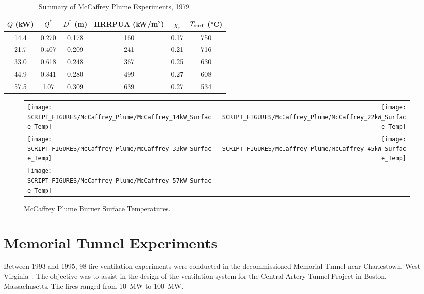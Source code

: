 \begin{table}[!ht]
\caption[Summary of McCaffrey Plume Experiments]{Summary of McCaffrey Plume Experiments, 1979.}
\begin{center}
\begin{tabular}{|c|c|c|c|c|c|}
\hline
$Q$ (kW) & $Q^*$    & $D^*$ (m)   & HRRPUA (kW/m$^2$)  & $\chi_r$ & $T_{\rm surf}$ (\si{\degreeCelsius}) \\ \hline\hline
14.4     & 0.270    & 0.178       & 160                & 0.17     & 750 \\ \hline
21.7     & 0.407    & 0.209       & 241                & 0.21     & 716 \\ \hline
33.0     & 0.618    & 0.248       & 367                & 0.25     & 630 \\ \hline
44.9     & 0.841    & 0.280       & 499                & 0.27     & 608 \\ \hline
57.5     & 1.07     & 0.309       & 639                & 0.27     & 534 \\ \hline
\end{tabular}
\end{center}
\label{tab:McCaffrey_Plume_Exp}
\end{table}

\begin{figure}[p]
\begin{tabular*}{\textwidth}{l@{\extracolsep{\fill}}r}
\texttt{[image: SCRIPT\_FIGURES/McCaffrey\_Plume/McCaffrey\_14kW\_Surface\_Temp]} &
\texttt{[image: SCRIPT\_FIGURES/McCaffrey\_Plume/McCaffrey\_22kW\_Surface\_Temp]} \\
\texttt{[image: SCRIPT\_FIGURES/McCaffrey\_Plume/McCaffrey\_33kW\_Surface\_Temp]} &
\texttt{[image: SCRIPT\_FIGURES/McCaffrey\_Plume/McCaffrey\_45kW\_Surface\_Temp]} \\
\texttt{[image: SCRIPT\_FIGURES/McCaffrey\_Plume/McCaffrey\_57kW\_Surface\_Temp]} &
\end{tabular*}
\caption[McCaffrey Plume Burner Surface Temperatures]
{McCaffrey Plume Burner Surface Temperatures.}
\label{fig:McCaffrey_Surf_Temp}
\end{figure}


\section{Memorial Tunnel Experiments}
\label{Memorial_Tunnel_Description}

Between 1993 and 1995, 98 fire ventilation experiments were conducted in the decommissioned Memorial Tunnel near Charlestown, West Virginia~\cite{Memorial}. The objective was to assist in the design of the ventilation system for the Central Artery Tunnel Project in Boston, Massachusetts. The fires ranged from 10~MW to 100~MW.

